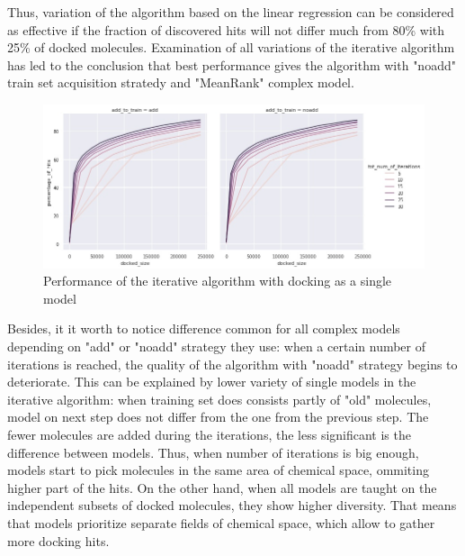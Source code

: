 Thus, variation of the algorithm based on the linear regression can be considered 
as effective if the fraction of discovered hits will not differ much from 80\% with 
25\% of docked molecules. 
Examination of all variations of the iterative algorithm has led to the conclusion 
that best performance gives the algorithm with "noadd" train set acquisition stratedy 
and "MeanRank" complex model.\\

\begin{figure}[H]
    \centering
    \includegraphics[width = \linewidth]{Images/DockingIterations.jpg}
    \caption{Performance of the iterative algorithm with docking as a single model}
    \label{docking}
\end{figure}

Besides, it it worth to notice difference common for all complex models depending 
on "add" or "noadd" strategy they use: when a certain number of iterations is reached, 
the quality of the algorithm with "noadd" strategy begins to deteriorate.
This can be explained by lower variety of single models in the iterative algorithm: 
when training set does consists partly of "old" molecules, model on next step does 
not differ from the one from the previous step.
The fewer molecules are added during the iterations, the less significant is the 
difference between models.
Thus, when number of iterations is big enough, models start to pick molecules in 
the same area of chemical space, ommiting higher part of the hits.
On the other hand, when all models are taught on the independent subsets of docked 
molecules, they show higher diversity.
That means that models prioritize separate fields of chemical space, which allow 
to gather more docking hits.\\
\hfill\break
